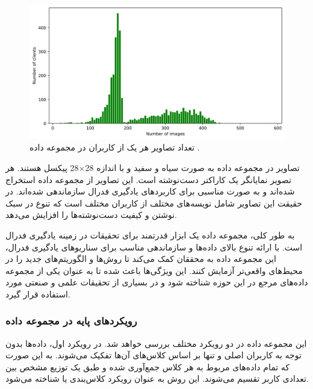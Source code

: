 \begin{figure}[t!]
	\centering
	\includegraphics[scale=0.7]{images/chap5/clients_images.png}%
	\caption{%
		تعداد تصاویر هر یک از کاربران در مجموعه داده
		.
	}
	\label{clients_images}
	\centering
\end{figure}



تصاویر در مجموعه داده
به صورت سیاه و سفید و با اندازه
28$\times$28
پیکسل هستند. هر تصویر نمایانگر یک کاراکتر دست‌نوشته است. این تصاویر از مجموعه داده
استخراج شده‌اند و به صورت مناسبی برای کاربردهای یادگیری فدرال سازماندهی شده‌اند. در حقیقت این تصاویر شامل نویسه‌های مختلف از کاربران مختلف است که تنوع در سبک نوشتن و کیفیت دست‌نوشته‌ها را افزایش می‌دهد.


به طور کلی، مجموعه داده
یک ابزار قدرتمند برای تحقیقات در زمینه یادگیری فدرال است. با ارائه تنوع بالای داده‌ها و سازماندهی مناسب برای سناریوهای یادگیری فدرال، این مجموعه داده به محققان کمک می‌کند تا روش‌ها و الگوریتم‌های جدید را در محیط‌های واقعی‌تر آزمایش کنند. این ویژگی‌ها باعث شده تا
به عنوان یکی از مجموعه داده‌های مرجع در این حوزه شناخته شود و در بسیاری از تحقیقات علمی و صنعتی مورد استفاده قرار گیرد.



\vspace{3mm}
\subsubsection{
	رویکردهای پایه در مجموعه داده
}\vspace{-1mm}


این مجموعه داده در دو رویکرد مختلف بررسی خواهد شد. در رویکرد اول، داده‌ها بدون توجه به کاربران اصلی و تنها بر اساس کلاس‌های آن‌ها تفکیک می‌شوند. به این صورت که تمام داده‌های مربوط به هر کلاس جمع‌آوری شده و طبق یک توزیع مشخص بین تعدادی کاربر تقسیم می‌شوند. این روش به عنوان رویکرد کلاس‌بندی یا
شناخته می‌شود.

